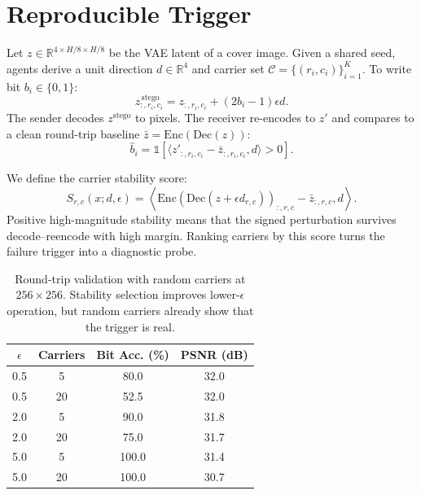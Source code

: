 \documentclass{article}
\begin{document}
\section{Reproducible Trigger}

Let $z\in\mathbb{R}^{4\times H/8\times H/8}$ be the VAE latent of a cover image. Given a shared seed, agents derive a unit direction $d\in\mathbb{R}^4$ and carrier set $\mathcal{C}=\{(r_i,c_i)\}_{i=1}^K$. To write bit $b_i\in\{0,1\}$:
\begin{equation}
    z_{:,r_i,c_i}^{\,\mathrm{stego}}
    =
    z_{:,r_i,c_i} + (2b_i-1)\epsilon d .
\end{equation}
The sender decodes $z^{\mathrm{stego}}$ to pixels. The receiver re-encodes to $z'$ and compares to a clean round-trip baseline $\bar z=\mathrm{Enc}(\mathrm{Dec}(z))$:
\begin{equation}
    \hat b_i =
    \mathbb{1}\left[
    \langle z'_{:,r_i,c_i}-\bar z_{:,r_i,c_i}, d\rangle > 0
    \right].
\end{equation}

We define the carrier stability score:
\begin{equation}
S_{r,c}(x;d,\epsilon)
=
\left\langle
\mathrm{Enc}(\mathrm{Dec}(z+\epsilon d_{r,c}))_{:,r,c}
-
\bar z_{:,r,c},
d
\right\rangle .
\end{equation}
Positive high-magnitude stability means that the signed perturbation survives decode--reencode with high margin. Ranking carriers by this score turns the failure trigger into a diagnostic probe.

\begin{table}[t]
\caption{Round-trip validation with random carriers at $256\times256$. Stability selection improves lower-$\epsilon$ operation, but random carriers already show that the trigger is real.}
\label{tab:roundtrip}
\centering
\begin{small}
\begin{tabular}{cccc}
\toprule
$\epsilon$ & Carriers & Bit Acc. (\%) & PSNR (dB) \\
\midrule
0.5 & 5  & 80.0  & 32.0 \\
0.5 & 20 & 52.5  & 32.0 \\
2.0 & 5  & 90.0  & 31.8 \\
2.0 & 20 & 75.0  & 31.7 \\
5.0 & 5  & 100.0 & 31.4 \\
5.0 & 20 & 100.0 & 30.7 \\
\bottomrule
\end{tabular}
\end{small}
\end{table}
\end{document}
